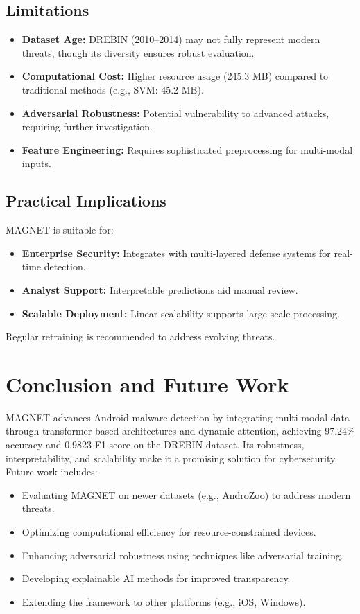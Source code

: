 \documentclass[10pt,conference]{IEEEtran}
\begin{document}
\subsection{Limitations}
\begin{itemize}
    \item \textbf{Dataset Age:} DREBIN (2010–2014) may not fully represent modern threats, though its diversity ensures robust evaluation.
    \item \textbf{Computational Cost:} Higher resource usage (245.3 MB) compared to traditional methods (e.g., SVM: 45.2 MB).
    \item \textbf{Adversarial Robustness:} Potential vulnerability to advanced attacks, requiring further investigation.
    \item \textbf{Feature Engineering:} Requires sophisticated preprocessing for multi-modal inputs.
\end{itemize}

\subsection{Practical Implications}
MAGNET is suitable for:
\begin{itemize}
    \item \textbf{Enterprise Security:} Integrates with multi-layered defense systems for real-time detection.
    \item \textbf{Analyst Support:} Interpretable predictions aid manual review.
    \item \textbf{Scalable Deployment:} Linear scalability supports large-scale processing.
\end{itemize}
Regular retraining is recommended to address evolving threats.

\section{Conclusion and Future Work}\label{sec:conclusion}
MAGNET advances Android malware detection by integrating multi-modal data through transformer-based architectures and dynamic attention, achieving 97.24\% accuracy and 0.9823 F1-score on the DREBIN dataset. Its robustness, interpretability, and scalability make it a promising solution for cybersecurity. Future work includes:
\begin{itemize}
    \item Evaluating MAGNET on newer datasets (e.g., AndroZoo) to address modern threats.
    \item Optimizing computational efficiency for resource-constrained devices.
    \item Enhancing adversarial robustness using techniques like adversarial training.
    \item Developing explainable AI methods for improved transparency.
    \item Extending the framework to other platforms (e.g., iOS, Windows).
\end{itemize}

\printbibliography
\end{document}
